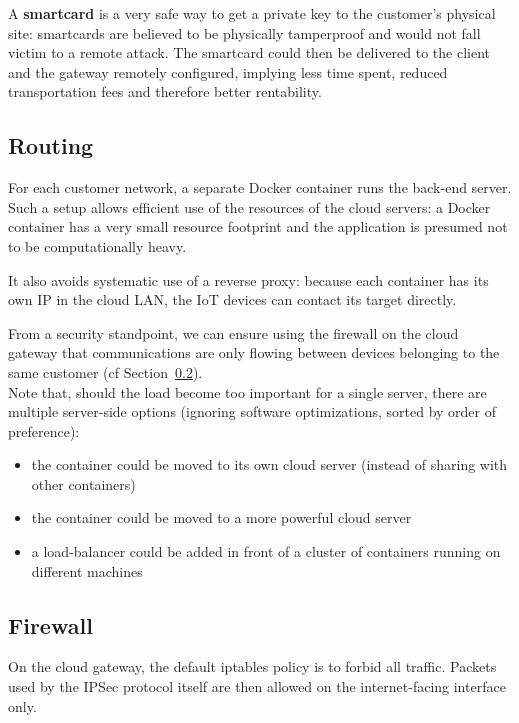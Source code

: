 \documentclass[paper=a4, fontsize=11pt]{scrartcl}
\begin{document}
A \textbf{smartcard} is a very safe way to get a private key to the customer's
physical site: smartcards are believed to be physically tamperproof and would
not fall victim to a remote attack.
The smartcard could then be delivered to the client and the gateway remotely
configured, implying less time spent, reduced transportation fees and
therefore better rentability.

\subsection{Routing}

For each customer network, a separate Docker container runs the back-end server.
Such a setup allows efficient use of the resources of the cloud servers: a
Docker container has a very small resource footprint and the application is
presumed not to be computationally heavy.

It also avoids systematic use of a reverse proxy: because each container has its
own IP in the cloud LAN, the IoT devices can contact its target directly.

From a security standpoint, we can ensure using the firewall on the cloud
gateway that communications are only flowing between devices belonging to
the same customer (cf Section~\ref{firewall}).
\\

Note that, should the load become too important for a single server, there are
multiple server-side options (ignoring software optimizations, sorted by order of
preference):
\begin{itemize}
    \item the container could be moved to its own cloud server (instead of
    sharing with other containers)
    \item the container could be moved to a more powerful cloud server
    \item a load-balancer could be added in front of a cluster of containers
        running on different machines
\end{itemize}

\subsection{Firewall}\label{firewall}

On the cloud gateway, the default iptables policy is to forbid all traffic.
Packets used by the IPSec protocol itself are then allowed on the
internet-facing interface only.
\end{document}
